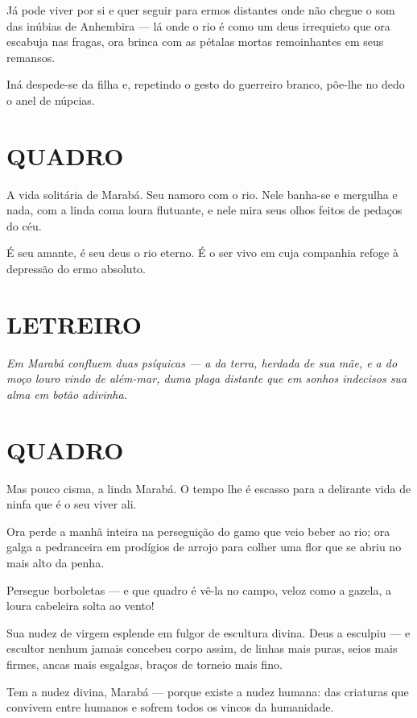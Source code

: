 Já pode viver por si e quer seguir para ermos distantes onde não chegue
o som das inúbias de Anhembira --- lá onde o rio é como um deus
irrequieto que ora escabuja nas fragas, ora brinca com as pétalas mortas
remoinhantes em seus remansos.

Iná despede-se da filha e, repetindo o gesto do guerreiro branco,
põe-lhe no dedo o anel de núpcias.

\section{QUADRO}

A vida solitária de Marabá. Seu namoro com o rio. Nele banha-se e
mergulha e nada, com a linda coma loura flutuante, e nele mira seus
olhos feitos de pedaços do céu.

É seu amante, é seu deus o rio eterno. É o ser vivo em cuja companhia
refoge à depressão do ermo absoluto.

\section{LETREIRO}

\emph{Em Marabá confluem duas psíquicas --- a da terra, herdada de sua
mãe, e a do moço louro vindo de além-mar, duma plaga distante que em
sonhos indecisos sua alma em botão adivinha.}

\section{QUADRO}

Mas pouco cisma, a linda Marabá. O tempo lhe é escasso para a delirante
vida de ninfa que é o seu viver ali.

Ora perde a manhã inteira na perseguição do gamo que veio beber ao rio;
ora galga a pedranceira em prodígios de arrojo para colher uma flor que
se abriu no mais alto da penha.

Persegue borboletas --- e que quadro é vê-la no campo, veloz como a
gazela, a loura cabeleira solta ao vento!

Sua nudez de virgem esplende em fulgor de escultura divina. Deus a
esculpiu --- e escultor nenhum jamais concebeu corpo assim, de linhas
mais puras, seios mais firmes, ancas mais esgalgas, braços de torneio
mais fino.

Tem a nudez divina, Marabá --- porque existe a nudez humana: das
criaturas que convivem entre humanos e sofrem todos os vincos da
humanidade.

